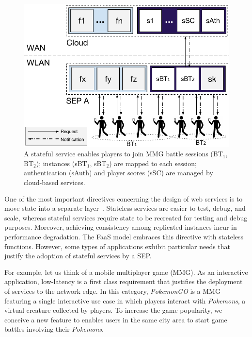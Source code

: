 \begin{figure}[bp]
	\centering
	\includegraphics[width=1\linewidth]{Figs/Stateful_Edge_Services.pdf}
	\caption{A stateful service enables players to join MMG battle sessions (BT$_1$, BT$_2$); instances (sBT$_1$, sBT$_2$) are mapped to each session; authentication (sAuth) and player scores (sSC) are managed by cloud-based services.}
	\label{fig:Steteful_Edge_MMG}
\end{figure}

One of the most important directives concerning the design of web services is to move state into a separate layer~\cite{Armbrust:2010}. Stateless services are easier to test, debug, and scale, whereas stateful services require state to be recreated for testing and debug purposes. Moreover, achieving consistency among replicated instances incur in performance degradation. The FaaS model embraces this directive with stateless functions.
However, some types of applications exhibit particular needs that justify the adoption of stateful services by a SEP.

For example, let us think of a mobile multiplayer game (MMG). As an interactive application, low-latency is a first class requirement that justifies the deployment of services to the network edge. In this category, \textit{PokemonGO} is 
a MMG featuring a single interactive use case in which players interact with \textit{Pokemons}, a virtual creature collected by players.
To increase the game popularity, we conceive a new feature to enables users in the same city area to start game battles involving their \textit{Pokemons}. 

